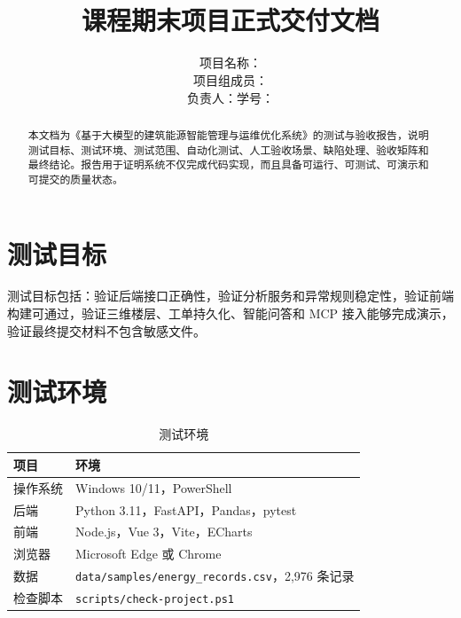 \documentclass[12pt,a4paper]{ctexart}
\title{
    \vspace{-2em}
    \heiti \zihao{2} \reporttitle \\
    \vspace{1em}
    \zihao{4} 课程期末项目正式交付文档
}
\author{
    \songti \zihao{4}
    项目名称：\projectname \\
    项目组成员：\teamname \\
    负责人：\studentname \quad 学号：\studentid
}
\date{\docdate}
\newcommand{\projectname}{基于大模型的建筑能源智能管理与运维优化系统}
\newcommand{\code}[1]{{\footnotesize\nolinkurl{#1}}}
\begin{document}
\maketitle
\thispagestyle{fancy}

\begin{abstract}
本文档为《\projectname》的测试与验收报告，说明测试目标、测试环境、测试范围、自动化测试、人工验收场景、缺陷处理、验收矩阵和最终结论。报告用于证明系统不仅完成代码实现，而且具备可运行、可测试、可演示和可提交的质量状态。
\end{abstract}

\tableofcontents
\newpage

\section{测试目标}
测试目标包括：验证后端接口正确性，验证分析服务和异常规则稳定性，验证前端构建可通过，验证三维楼层、工单持久化、智能问答和 MCP 接入能够完成演示，验证最终提交材料不包含敏感文件。

\section{测试环境}
\begin{table}[H]
\centering
\caption{测试环境}
\begin{tabularx}{\textwidth}{p{4cm}Y}
\toprule
项目 & 环境 \\
\midrule
操作系统 & Windows 10/11，PowerShell \\
后端 & Python 3.11，FastAPI，Pandas，pytest \\
前端 & Node.js，Vue 3，Vite，ECharts \\
浏览器 & Microsoft Edge 或 Chrome \\
数据 & \code{data/samples/energy_records.csv}，2,976 条记录 \\
检查脚本 & \code{scripts/check-project.ps1} \\
\bottomrule
\end{tabularx}
\end{table}
\end{document}
